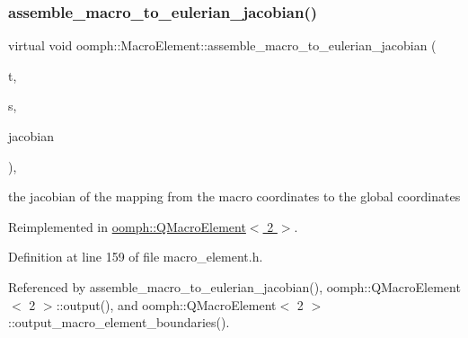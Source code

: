 \subsubsection{\texorpdfstring{assemble\+\_\+macro\+\_\+to\+\_\+eulerian\+\_\+jacobian()}{assemble\_macro\_to\_eulerian\_jacobian()}\hspace{0.1cm}{\footnotesize\ttfamily [1/2]}}
{\footnotesize\ttfamily virtual void oomph\+::\+Macro\+Element\+::assemble\+\_\+macro\+\_\+to\+\_\+eulerian\+\_\+jacobian (\begin{DoxyParamCaption}\item[{const unsigned \&}]{t,  }\item[{const \hyperlink{classoomph_1_1Vector}{Vector}$<$ double $>$ \&}]{s,  }\item[{\hyperlink{classoomph_1_1DenseMatrix}{Dense\+Matrix}$<$ double $>$ \&}]{jacobian }\end{DoxyParamCaption})\hspace{0.3cm}{\ttfamily [inline]}, {\ttfamily [virtual]}}



the jacobian of the mapping from the macro coordinates to the global coordinates 



Reimplemented in \hyperlink{classoomph_1_1QMacroElement_3_012_01_4_a74aaa1b631144e956b5f61e8d0cd9f05}{oomph\+::\+Q\+Macro\+Element$<$ 2 $>$}.



Definition at line 159 of file macro\+\_\+element.\+h.



Referenced by assemble\+\_\+macro\+\_\+to\+\_\+eulerian\+\_\+jacobian(), oomph\+::\+Q\+Macro\+Element$<$ 2 $>$\+::output(), and oomph\+::\+Q\+Macro\+Element$<$ 2 $>$\+::output\+\_\+macro\+\_\+element\+\_\+boundaries().

\mbox{\label{classoomph_1_1MacroElement_a5640171931fffc8add41437596d3df20}} 
